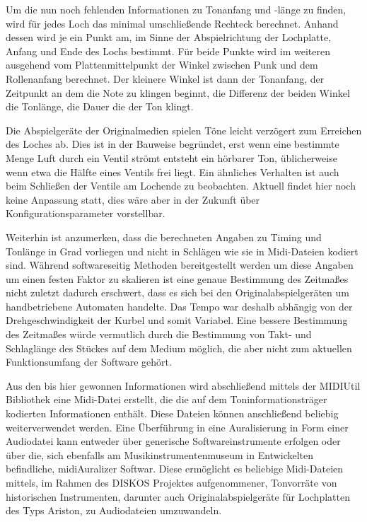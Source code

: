 Um die nun noch fehlenden Informationen zu Tonanfang und -länge zu finden, wird für jedes Loch das minimal umschließende Rechteck berechnet.
Anhand dessen wird je ein Punkt am, im Sinne der Abspielrichtung der Lochplatte, Anfang und Ende des Lochs bestimmt.
Für beide Punkte wird im weiteren ausgehend vom Plattenmittelpunkt der Winkel zwischen Punk und dem Rollenanfang berechnet. %
Der kleinere Winkel ist dann der Tonanfang, der Zeitpunkt an dem die Note zu klingen beginnt, die Differenz der beiden Winkel die Tonlänge, die Dauer die der Ton klingt.

Die Abspielgeräte der Originalmedien spielen Töne leicht verzögert zum Erreichen des Loches ab.
Dies ist in der Bauweise begründet, erst wenn eine bestimmte Menge Luft durch ein Ventil strömt entsteht ein hörbarer Ton, üblicherweise wenn etwa die Hälfte eines Ventils frei liegt.
Ein ähnliches Verhalten ist auch beim Schließen der Ventile am Lochende zu beobachten.
Aktuell findet hier noch keine Anpassung statt, dies wäre aber in der Zukunft über Konfigurationsparameter vorstellbar.

Weiterhin ist anzumerken, dass die berechneten Angaben zu Timing und Tonlänge in Grad vorliegen und nicht in Schlägen wie sie in Midi-Dateien kodiert sind.
Während softwareseitig Methoden bereitgestellt werden um diese Angaben um einen festen Faktor zu skalieren ist eine genaue Bestimmung des Zeitmaßes nicht zuletzt dadurch erschwert, dass es sich bei den Originalabspielgeräten um handbetriebene Automaten handelte.
Das Tempo war deshalb abhängig von der Drehgeschwindigkeit der Kurbel und somit Variabel.
Eine bessere Bestimmung des Zeitmaßes würde vermutlich durch die Bestimmung von Takt- und Schlaglänge des Stückes auf dem Medium möglich, die aber nicht zum aktuellen Funktionsumfang der Software gehört.

Aus den bis hier gewonnen Informationen wird abschließend mittels der MIDIUtil Bibliothek \parencite[]{midiutil} eine Midi-Datei erstellt, die die auf dem Toninformationsträger kodierten Informationen enthält.
Diese Dateien können anschließend beliebig weiterverwendet werden.
Eine Überführung in eine Auralisierung in Form einer Audiodatei kann entweder über generische Softwareinstrumente erfolgen oder über die, sich ebenfalls am Musikinstrumentenmuseum in Entwickelten befindliche, midiAuralizer \parencite[]{midiauralizer} Softwar.
Diese ermöglicht es beliebige Midi-Dateien mittels, im Rahmen des DISKOS Projektes aufgenommener, Tonvorräte von historischen Instrumenten, darunter auch Originalabspielgeräte für Lochplatten des Typs Ariston, zu Audiodateien umzuwandeln.

